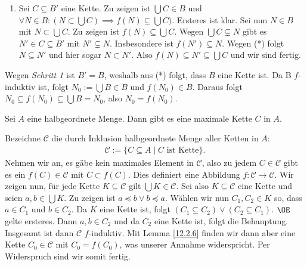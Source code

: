 \documentclass[../../main.tex]{subfiles}
\begin{document}
\begin{cproof}
\begin{tcolorbox}[arc=0mm, boxrule=0.2mm]
\begin{enumerate}[\normalfont(a)]
				\item Sei $C\subseteq B'$ eine Kette. Zu zeigen ist $\bigcup C\in B$ und $\forall N\in B: (N\subset \bigcup C)\implies f(N)\subseteq \bigcup C)$. Ersteres ist klar. Sei nun $N\in B$ mit $N\subset \bigcup C$. Zu zeigen ist $f(N)\subseteq \bigcup C$. Wegen $\bigcup C\subsetneq N$ gibt es $N'\in C\subseteq B'$ mit $N'\subsetneq N$. Insbesondere ist $f(N')\subseteq N$. Wegen (*) folgt $N\subseteq N'$ und hier sogar $N\subset N'$. Also $f(N)\subseteq N'\subseteq \bigcup C$ und wir sind fertig.
			\end{enumerate}
	\end{tcolorbox}
	\noindent Wegen \textit{Schritt 1} ist $B'=B$, weshalb aus (*) folgt, dass $B$ eine Kette ist. Da B $f$-induktiv ist, folgt $N_0:=\bigcup B\in B$ und $f(N_0)\in B$. Daraus folgt $N_0\subseteq f(N_0)\subseteq \bigcup B=N_0$, also $N_0=f(N_0)$.
\end{cproof}

\begin{lem}\label{12.2.7} Sei $A$ eine halbgeordnete Menge. Dann gibt es eine maximale Kette $C$ in $A$.
\end{lem}
\begin{cproof}
Bezeichne $\mathcal{C}$ die durch Inklusion halbgeordnete Menge aller Ketten in $A$:
\begin{align*}
\mathcal{C}:=\{C\subseteq A\mid C\text{ ist Kette}\}.
\end{align*}
Nehmen wir an, es gäbe kein maximales Element in $\mathcal{C}$, also zu jedem $C\in\mathcal{C}$ gibt es ein $f(C)\in\mathcal{C}$ mit $C\subset f(C)$. Dies definiert eine Abbildung $f: \mathcal{C}\rightarrow \mathcal{C}$. Wir zeigen nun, für jede Kette $K\subseteq\mathcal{C}$ gilt $\bigcup K\in \mathcal{C}$. Sei also $K\subseteq\mathcal{C}$ eine Kette und seien $a,b\in \bigcup K$. Zu zeigen ist $a\preceq b\lor b\preceq a$. Wählen wir nun $C_1,C_2\in K$ so, dass $a\in C_1$ und $b\in C_2$. Da $K$ eine Kette ist, folgt $(C_1\subseteq C_2)\lor (C_2\subseteq C_1)$. $\OE$ gelte ersteres. Dann $a,b\in C_2$ und da $C_2$ eine Kette ist, folgt die Behauptung.\\
				
Insgesamt ist dann $\mathcal{C}$ $f$-induktiv. Mit Lemma \eqref{12.2.6} finden wir dann aber eine Kette $C_0\in\mathcal{C}$ mit $C_0=f(C_0)$, was unserer Annahme widerspricht. Per Widerspruch sind wir somit fertig.
\end{cproof}
\end{document}
